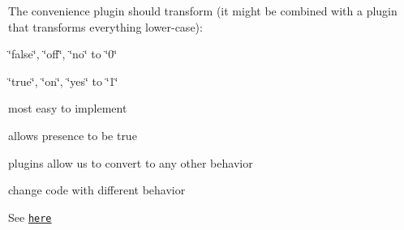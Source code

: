 The convenience plugin should transform (it might be combined with a plugin that transforms everything lower-\/case)\+:


\begin{DoxyItemize}
\item \char`\"{}false\char`\"{}, \char`\"{}off\char`\"{}, \char`\"{}no\char`\"{} to \char`\"{}0\char`\"{}
\item \char`\"{}true\char`\"{}, \char`\"{}on\char`\"{}, \char`\"{}yes\char`\"{} to \char`\"{}1\char`\"{}
\end{DoxyItemize}


\begin{DoxyItemize}
\item most easy to implement
\item allows presence to be true
\item plugins allow us to convert to any other behavior
\end{DoxyItemize}


\begin{DoxyItemize}
\item change code with different behavior
\end{DoxyItemize}

See \href{https://github.com/ElektraInitiative/libelektra/issues/308}{\tt here} 